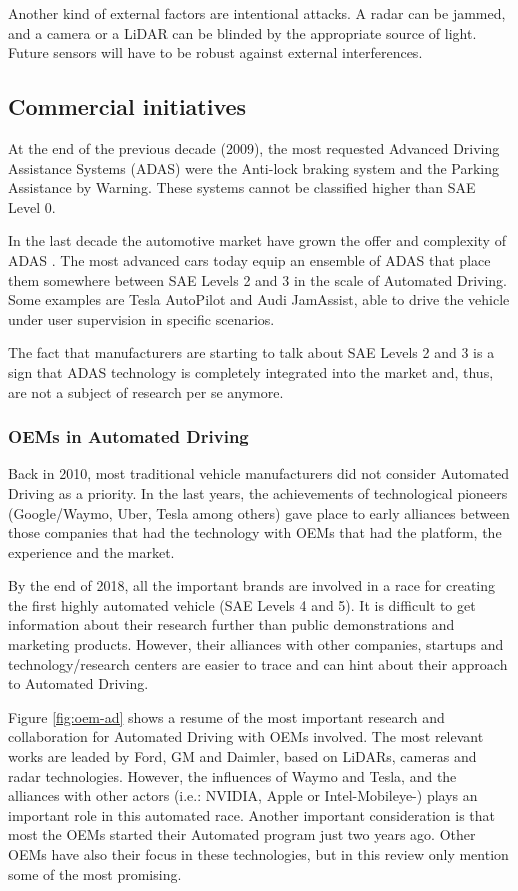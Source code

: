 Another kind of external factors are intentional attacks. A radar can be jammed,
and a camera or a LiDAR can be blinded by the appropriate source of light.
Future sensors will have to be robust against external interferences.

\subsection{Commercial initiatives}

At the end of the previous decade (2009), 
the most requested  Advanced Driving Assistance Systems (ADAS) 
\cite{Frost&Sullivan2010} were the Anti-lock braking system and the Parking 
Assistance by Warning. These systems cannot be classified
higher than SAE Level 0.

In the last decade the automotive market have grown the offer and complexity
of ADAS \cite{Perez2016}. The most advanced cars today equip an ensemble of 
ADAS that place them somewhere between SAE Levels 2 and 3 in the scale of Automated
Driving. Some examples are Tesla AutoPilot and Audi JamAssist, able to
drive the vehicle under user supervision in specific scenarios.

The fact that manufacturers are starting to talk about SAE Levels 2 and 3
is a sign that ADAS technology is completely integrated into the market and, thus, are not a subject of research per se anymore.  

\subsubsection{OEMs in Automated Driving}
\label{sec:oem-ad}

Back in 2010, most traditional vehicle manufacturers did not consider Automated
Driving as a priority. In the last years, the achievements of technological 
pioneers (Google/Waymo, Uber, Tesla among others) gave place to early alliances
between those companies that had the technology with OEMs that had the
platform, the experience and the market.

By the end of 2018, all the important brands are involved in a race for creating
the first highly automated vehicle (SAE Levels 4 and 5). It is difficult to
get information about their research further than public demonstrations and
marketing products. However, their alliances with other companies, startups
and technology/research centers are easier to trace and can hint about their 
approach to Automated Driving.


Figure \ref{fig:oem-ad} shows a resume of the most important research and collaboration for Automated Driving with OEMs involved. The most relevant works are leaded by Ford, GM and Daimler, based on LiDARs, cameras and radar technologies. However, the influences of Waymo and Tesla, and the alliances with other actors (i.e.: NVIDIA, Apple or Intel-Mobileye-) plays an important role in this automated race. Another important consideration is that most the OEMs started their Automated program just two years ago. Other OEMs have also their focus in these technologies, but in this review only mention some of the most promising.

